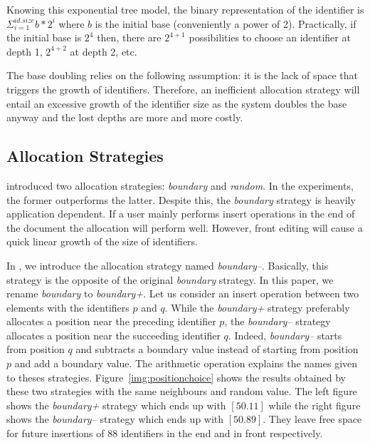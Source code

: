Knowing this exponential tree model, the binary representation of the
identifier is $\Sigma_{i=1}^{id.size} b*2^i$ where $b$ is the initial base
(conveniently a power of 2). Practically, if the initial base is $2^4$ then,
there are $2^{4+1}$ possibilities to choose an identifier at depth 1, $2^{4+2}$
at depth 2, etc.

The base doubling relies on the following assumption: it is the lack of space
that triggers the growth of identifiers. Therefore, an inefficient allocation
strategy will entail an excessive growth of the identifier size as the system
doubles the base anyway and the lost depths are more and more costly.

\subsection{Allocation Strategies}

\cite{weiss2009logoot} introduced two allocation strategies: \emph{boundary}
and \emph{random}. In the experiments, the former outperforms the
latter. Despite this, the \emph{boundary} strategy is heavily application
dependent. If a user mainly performs insert operations in the end of the
document the allocation will perform well. However, front editing will cause a
quick linear growth of the size of identifiers.

In \NAME{}, we introduce the allocation strategy named
\emph{boundary--}. Basically, this strategy is the opposite of the original
\emph{boundary} strategy. In this paper, we rename \emph{boundary} to
\emph{boundary+}. Let us consider an insert operation between two elements with
the identifiers $p$ and $q$. While the \emph{boundary+} strategy preferably
allocates a position near the preceding identifier $p$, the \emph{boundary--}
strategy allocates a position near the succeeding identifier $q$. Indeed,
\emph{boundary--} starts from position $q$ and subtracts a boundary value
instead of starting from position $p$ and add a boundary value. The arithmetic
operation explains the names given to theses
strategies. Figure~\ref{img:positionchoice} shows the results obtained by these
two strategies with the same neighbours and random value. The left figure shows
the \emph{boundary+} strategy which ends up with $[50.11]$ while the right
figure shows the \emph{boundary--} strategy which ends up with $[50.89]$. They
leave free space for future insertions of 88 identifiers in the end and in
front respectively.

